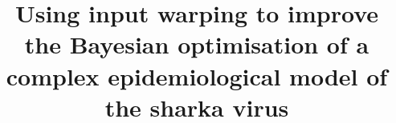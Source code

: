 %
%
%
%
%
%
\RequirePackage{fix-cm}
%
\documentclass[smallextended]{svjour3}       %
%
\smartqed  %
%
\usepackage{booktabs}
\usepackage{graphicx}
\usepackage{times}
\usepackage{latexsym,mathrsfs}
\usepackage{amssymb,amsfonts,amsmath}
\usepackage[numbers]{natbib}
\usepackage{color}
\usepackage{graphics}
\usepackage{graphicx}
\usepackage{bbm}
\usepackage{url}
\def\ds{\displaystyle}
\def\R{\mathbb{R}}
\newcommand{\x}{\mathbf{x}}
\newcommand{\X}{\mathbf{X}}
\newcommand{\y}{\mathbf{y}}
\newcommand{\f}{\mathbf{f}}
\newcommand{\Y}{\mathbf{Y}}
\newcommand{\F}{\mathbf{F}}
\newcommand{\z}{\mathbf{z}}
\newcommand{\s}{\mathbf{x}}
\newcommand{\Sset}{\mathbb{X}}
\newcommand{\Rset}{\mathbb{R}}
\newcommand{\Xset}{\mathbb{X}}
\newcommand{\Prob}{\mathbb{P}}

\usepackage[dvipsnames,svgnames]{xcolor}
\usepackage[normalem]{ulem}
\usepackage{collab_tex}



\title{Using input warping to improve the Bayesian optimisation of a complex epidemiological model of the sharka virus %
}

